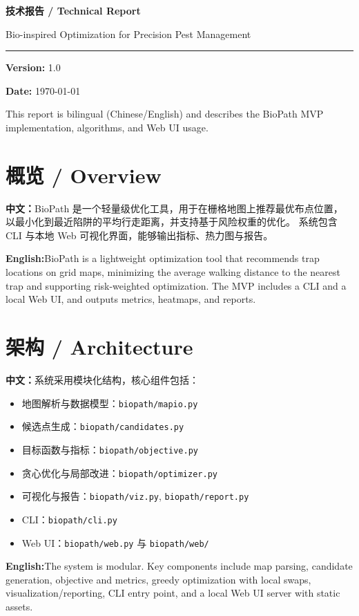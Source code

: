 \documentclass[11pt,a4paper]{article}
\newcommand{\CN}{\textbf{中文：}}
\newcommand{\EN}{\textbf{English:}}
\begin{document}
\onehalfspacing

\begin{titlepage}
  \vspace*{1.2cm}
  \par
  \vspace{0.4cm}
  {\huge\bfseries 技术报告 / Technical Report}\par
  \vspace{0.6cm}
  {\large Bio-inspired Optimization for Precision Pest Management}\par
  \vspace{0.8cm}
  \textcolor{SoftAccent}{\rule{\linewidth}{1.2pt}}\par
  \vspace{0.8cm}
  \textbf{Version:} 1.0\par
  \textbf{Date:} \today\par
  \vfill
  \noindent
  \textcolor{Muted}{This report is bilingual (Chinese/English) and describes the BioPath MVP
  implementation, algorithms, and Web UI usage.}
\end{titlepage}

\section{概览 / Overview}
\CN BioPath 是一个轻量级优化工具，用于在栅格地图上推荐最优布点位置，
以最小化到最近陷阱的平均行走距离，并支持基于风险权重的优化。
系统包含 CLI 与本地 Web 可视化界面，能够输出指标、热力图与报告。\par
\EN BioPath is a lightweight optimization tool that recommends trap locations on grid maps,
minimizing the average walking distance to the nearest trap and supporting risk-weighted
optimization. The MVP includes a CLI and a local Web UI, and outputs metrics, heatmaps,
and reports.

\section{架构 / Architecture}
\CN 系统采用模块化结构，核心组件包括：\par
\begin{itemize}
  \item 地图解析与数据模型：\texttt{biopath/mapio.py}
  \item 候选点生成：\texttt{biopath/candidates.py}
  \item 目标函数与指标：\texttt{biopath/objective.py}
  \item 贪心优化与局部改进：\texttt{biopath/optimizer.py}
  \item 可视化与报告：\texttt{biopath/viz.py}, \texttt{biopath/report.py}
  \item CLI：\texttt{biopath/cli.py}
  \item Web UI：\texttt{biopath/web.py} 与 \texttt{biopath/web/}
\end{itemize}
\EN The system is modular. Key components include map parsing, candidate generation,
objective and metrics, greedy optimization with local swaps, visualization/reporting,
CLI entry point, and a local Web UI server with static assets.
\end{document}
